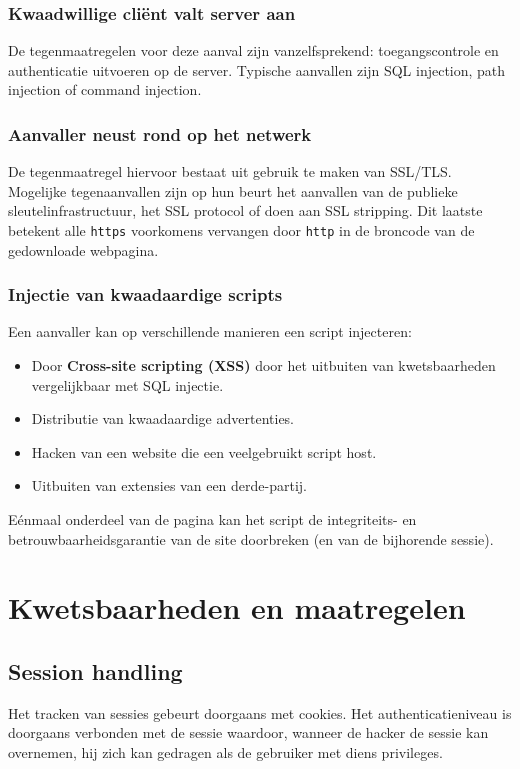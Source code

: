\documentclass[../main.tex]{subfiles}
\begin{document}
\subsubsection{Kwaadwillige cli\"ent valt server aan}
De tegenmaatregelen voor deze aanval zijn vanzelfsprekend: toegangscontrole en authenticatie uitvoeren op de server. Typische aanvallen zijn SQL injection, path injection of command injection.

\subsubsection{Aanvaller neust rond op het netwerk}
De tegenmaatregel hiervoor bestaat uit gebruik te maken van SSL/TLS. Mogelijke tegenaanvallen zijn op hun beurt het aanvallen van de publieke sleutelinfrastructuur, het SSL protocol of doen aan SSL stripping. Dit laatste betekent alle \texttt{https} voorkomens vervangen door \texttt{http} in de broncode van de gedownloade webpagina.

\subsubsection{Injectie van kwaadaardige scripts}
Een aanvaller kan op verschillende manieren een script injecteren:
\begin{itemize}
	\item Door \textbf{Cross-site scripting (XSS)} door het uitbuiten van kwetsbaarheden vergelijkbaar met SQL injectie.
	\item Distributie van kwaadaardige advertenties.
	\item Hacken van een website die een veelgebruikt script host.
	\item Uitbuiten van extensies van een derde-partij.
\end{itemize}
E\'enmaal onderdeel van de pagina kan het script de integriteits- en betrouwbaarheidsgarantie van de site doorbreken (en van de bijhorende sessie).

\section{Kwetsbaarheden en maatregelen}

\subsection{Session handling}
Het tracken van sessies gebeurt doorgaans met cookies. Het authenticatieniveau is doorgaans verbonden met de sessie waardoor, wanneer de hacker de sessie kan overnemen, hij zich kan gedragen als de gebruiker met diens privileges.
\end{document}

